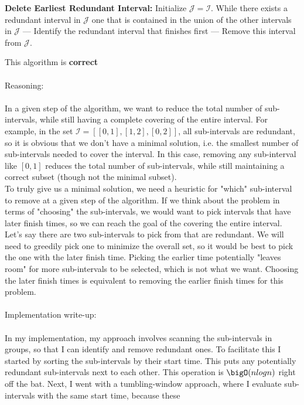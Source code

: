 \documentclass{hw_template}
\begin{document}
\begin{problem}
  \begin{subproblem}
    \textbf{Delete Earliest Redundant Interval:}
    Initialize $\mathcal{J}=\mathcal{I}$. While there
  exists a redundant interval in $\mathcal{J}$ one
  that is contained in the union of the other intervals
  in $\mathcal{J}$ --- Identify the redundant interval that finishes first --- Remove this interval from $\mathcal{J}$.
\end{subproblem}

\begin{solution}
This algorithm is \textbf{correct}\\\\
Reasoning:\\\\
In a given step of the algorithm, we want to reduce the total number of sub-intervals, while still having a complete 
covering of the entire interval. For example, in the set $\mathcal{I} = [[0,1], [1,2], [0,2]]$, all sub-intervals are redundant, so it
is obvious that we don't have a minimal solution, i.e. the smallest number of sub-intervals needed to cover the interval. 
In this case, removing any sub-interval like $[0,1]$ reduces the total number of sub-intervals, while still maintaining a correct subset 
(though not the minimal subset).\\
To truly give us a minimal solution, we need a heuristic for "which" sub-interval to remove at a given step of the algorithm. If we think about 
the problem in terms of "choosing" the sub-intervals, we would want to pick intervals that have later finish times, so we can reach the goal 
of the covering the entire interval. Let's say there are two sub-intervals to pick from that are redundant. We will need to greedily pick one to
minimize the overall set, so it would be best to pick the one with the later finish time. Picking the earlier time potentially "leaves room" for more 
sub-intervals to be selected, which is not what we want. Choosing the later finish times is equivalent to removing the earlier finish times for 
this problem.\\\\
Implementation write-up:\\\\
In my implementation, my approach involves scanning the sub-intervals in groups, so that I can identify and remove redundant ones. To facilitate this 
I started by sorting the sub-intervals by their start time. This puts any potentially redundant sub-intervals next to each other. This operation is 
$\bigO(nlogn)$ right off the bat. Next, I went with a tumbling-window approach, where I evaluate sub-intervals with the same start time, because these 

\end{solution}
\end{problem}
\end{document}
